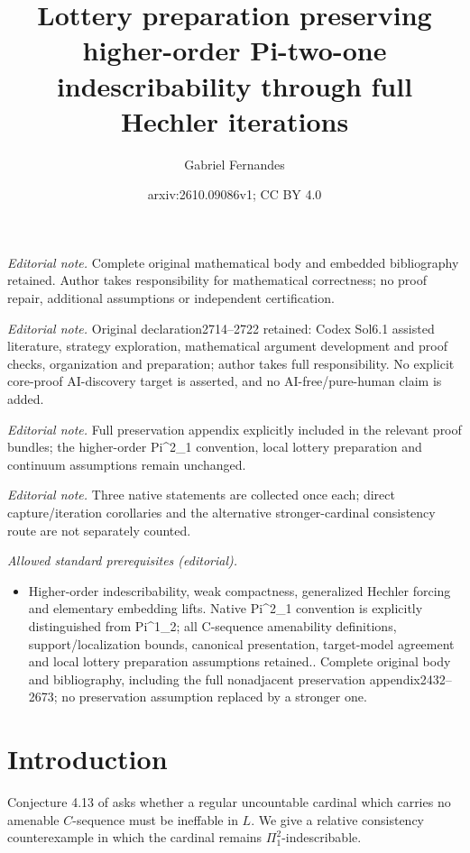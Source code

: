 \documentclass[10pt,a4paper]{amsart}
\title{Lottery preparation preserving higher-order Pi-two-one indescribability through full Hechler iterations}
\author{Gabriel Fernandes}
\date{arxiv:2610.09086v1; CC BY 4.0}
\theoremstyle{definition}
\theoremstyle{remark}
\begin{document}
\maketitle
\noindent\textit{Editorial note.} Complete original mathematical body and embedded bibliography retained. Author takes responsibility for mathematical correctness; no proof repair, additional assumptions or independent certification.\par\medskip
\noindent\textit{Editorial note.} Original declaration2714--2722 retained: Codex Sol6.1 assisted literature, strategy exploration, mathematical argument development and proof checks, organization and preparation; author takes full responsibility. No explicit core-proof AI-discovery target is asserted, and no AI-free/pure-human claim is added.\par\medskip
\noindent\textit{Editorial note.} Full preservation appendix explicitly included in the relevant proof bundles; the higher-order Pi\textasciicircum{}2\_1 convention, local lottery preparation and continuum assumptions remain unchanged.\par\medskip
\noindent\textit{Editorial note.} Three native statements are collected once each; direct capture/iteration corollaries and the alternative stronger-cardinal consistency route are not separately counted.\par\medskip
\noindent\textit{Allowed standard prerequisites (editorial).}\begin{itemize}
\item Higher-order indescribability, weak compactness, generalized Hechler forcing and elementary embedding lifts. Native Pi\textasciicircum{}2\_1 convention is explicitly distinguished from Pi\textasciicircum{}1\_2; all C-sequence amenability definitions, support/localization bounds, canonical presentation, target-model agreement and local lottery preparation assumptions retained.. Complete original body and bibliography, including the full nonadjacent preservation appendix2432--2673; no preservation assumption replaced by a stronger one.
\end{itemize}\medskip
\section{Introduction}\label{sec:introduction}

Conjecture 4.13 of \cite{IR} asks whether a regular uncountable
cardinal which carries no amenable \(C\)-sequence must be
ineffable in \(L\). We give a relative consistency
counterexample in which the cardinal remains
\(\Pi^2_1\)-indescribable. 
\end{document}
